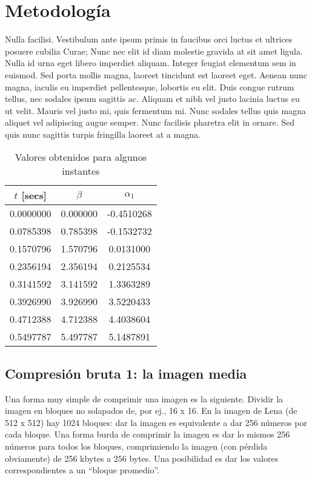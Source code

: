 \documentclass[twocolumn,a4paper,10pt]{article}
\begin{document}
\section{Metodología}
Nulla facilisi. Vestibulum ante ipsum primis in faucibus orci luctus et ultrices posuere cubilia Curae; Nunc nec elit id diam molestie gravida at sit amet ligula. Nulla id urna eget libero imperdiet aliquam. Integer feugiat elementum sem in euismod. Sed porta mollis magna, laoreet tincidunt est laoreet eget. Aenean nunc magna, iaculis eu imperdiet pellentesque, lobortis eu elit. Duis congue rutrum tellus, nec sodales ipsum sagittis ac. Aliquam et nibh vel justo lacinia luctus eu ut velit. Mauris vel justo mi, quis fermentum mi. Nunc sodales tellus quis magna aliquet vel adipiscing augue semper. Nunc facilisis pharetra elit in ornare. Sed quis nunc sagittis turpis fringilla laoreet at a magna.
\begin{table}
    \center
    \begin{tabular}{c|c|c}
            $t$ [secs] & $\beta$ & $\alpha_1$ \\ \hline \hline
       0.0000000  &  0.000000  & -0.4510268 \\
       0.0785398  &  0.785398  & -0.1532732 \\
       0.1570796  &  1.570796  &  0.0131000 \\
       0.2356194  &  2.356194  &  0.2125534 \\
       0.3141592  &  3.141592  &  1.3363289 \\
       0.3926990  &  3.926990  &  3.5220433 \\
       0.4712388  &  4.712388  &  4.4038604 \\
       0.5497787  &  5.497787  &  5.1487891 \\

    \end{tabular}
    \caption{Valores obtenidos para algunos instantes}
    \label{tabla_segundo_punto}
\end{table}

\subsection{Compresi\'on bruta 1: la imagen media}

Una forma muy simple de comprimir una imagen es la siguiente. Dividir la imagen en bloques no solapados de, por ej., 16 x 16. En la imagen de Lena (de 512 x 512) 
hay 1024 bloques: dar la imagen es equivalente a dar 256 n\'umeros por cada bloque. Una forma burda de comprimir la imagen es dar lo mismos 256 n\'umeros para todos 
los bloques, comprimiendo la imagen (con p\'erdida obviamente) de 256 kbytes a 256 bytes. Una posibilidad es dar los valores correspondientes a un ``bloque promedio''.\\
\end{document}
